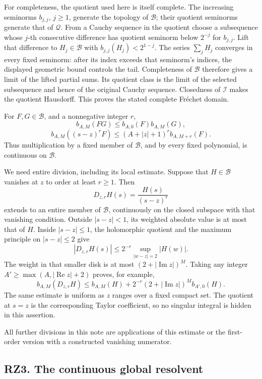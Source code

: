 \documentclass[
]{article}
\begin{document}
For completeness, the quotient used here is itself complete. The
increasing seminorms \(b_{j,j}\), \(j\geq1\), generate the topology of
\(\mathcal B\); their quotient seminorms generate that of
\(\mathcal Q\). From a Cauchy sequence in the quotient choose a
subsequence whose \(j\)-th consecutive difference has quotient seminorm
below \(2^{-j}\) for \(b_{j,j}\). Lift that difference to
\(H_j\in\mathcal B\) with \(b_{j,j}(H_j)<2^{1-j}\). The series
\(\sum_jH_j\) converges in every fixed seminorm: after its index exceeds
that seminorm's indices, the displayed geometric bound controls the
tail. Completeness of \(\mathcal B\) therefore gives a limit of the
lifted partial sums. Its quotient class is the limit of the selected
subsequence and hence of the original Cauchy sequence. Closedness of
\(\mathcal I\) makes the quotient Hausdorff. This proves the stated
complete Fréchet domain.

For \(F,G\in\mathcal B\), and a nonnegative integer \(r\), \[
b_{A,M}(FG)\leq b_{A,0}(F)b_{A,M}(G),
\tag{RZ2.2}
\] \[
b_{A,M}((s-z)^rF)
\leq(A+|z|+1)^r b_{A,M+r}(F).
\tag{RZ2.3}
\] Thus multiplication by a fixed member of \(\mathcal B\), and by every
fixed polynomial, is continuous on \(\mathcal B\).

We need entire division, including its local estimate. Suppose that
\(H\in\mathcal B\) vanishes at \(z\) to order at least \(r\geq1\). Then
\[
D_{z,r}H(s)=\frac{H(s)}{(s-z)^r}
\tag{RZ2.4}
\] extends to an entire member of \(\mathcal B\), continuously on the
closed subspace with that vanishing condition. Outside \(|s-z|<1\), its
weighted absolute value is at most that of \(H\). Inside \(|s-z|\leq1\),
the holomorphic quotient and the maximum principle on \(|s-z|\leq2\)
give \[
|D_{z,r}H(s)|
\leq 2^{-r}\sup_{|w-z|=2}|H(w)|.
\tag{RZ2.5}
\] The weight in that smaller disk is at most
\((2+|\operatorname{Im}z|)^M\). Taking any integer
\(A'\geq\max(A,|\operatorname{Re}z|+2)\) proves, for example, \[
b_{A,M}(D_{z,r}H)
\leq b_{A,M}(H)
+2^{-r}(2+|\operatorname{Im}z|)^M b_{A',0}(H).
\tag{RZ2.6}
\] The same estimate is uniform as \(z\) ranges over a fixed compact
set. The quotient at \(s=z\) is the corresponding Taylor coefficient, so
no singular integral is hidden in this assertion.

All further divisions in this note are applications of this estimate or
the first-order version with a constructed vanishing numerator.

\subsection{RZ3. The continuous global
resolvent}\label{rz3.-the-continuous-global-resolvent}
\end{document}
